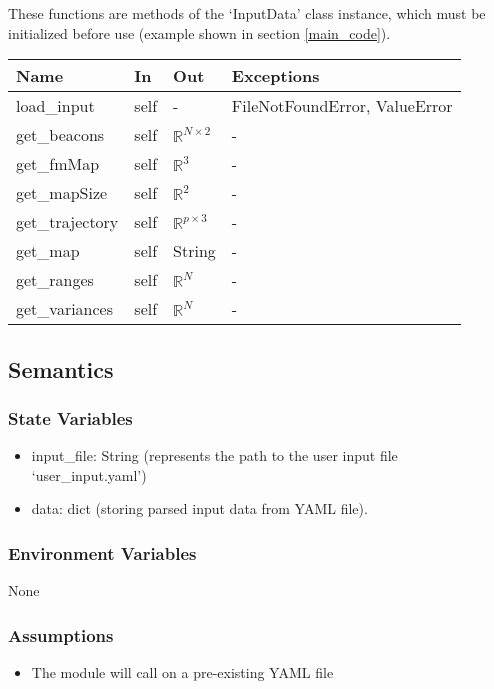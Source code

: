 \documentclass[12pt, titlepage]{article}
\begin{document}
These functions are methods of the `InputData' class instance, which must be initialized before use (example shown in section \ref{main_code}).

\begin{center}
\begin{tabular}{p{3cm} p{2cm} p{2cm} p{4cm}}
\hline
\textbf{Name} & \textbf{In} & \textbf{Out} & \textbf{Exceptions} \\
\hline
load\_input & self & -& FileNotFoundError, ValueError \\
get\_beacons& self & $\mathbb{R}^{N \times 2}$ & - \\
get\_fmMap& self & $\mathbb{R}^3$ & - \\
get\_mapSize& self & $\mathbb{R}^2$ & - \\
get\_trajectory& self & $\mathbb{R}^{p \times 3}$ & - \\
get\_map& self & String & - \\
get\_ranges& self & $\mathbb{R}^N$ & - \\
get\_variances& self & $\mathbb{R}^N$ & - \\
\hline
\end{tabular}
\end{center}

\subsection{Semantics}

\subsubsection{State Variables}
\begin{itemize}
  \item input\_file: String (represents the path to the user input file `user\_input.yaml')
  \item data: dict (storing parsed input data from YAML file).
\end{itemize}

\subsubsection{Environment Variables}
None

\subsubsection{Assumptions}
\begin{itemize}
  \item The module will call on a pre-existing YAML file
\end{itemize}
\end{document}

